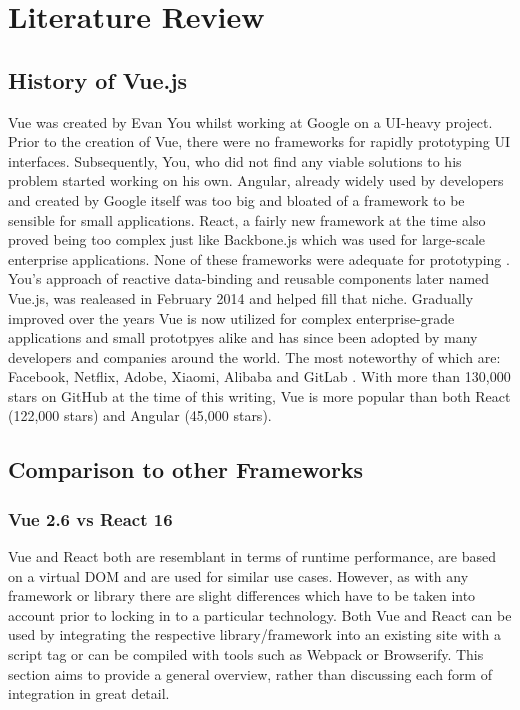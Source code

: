 \chapter[Literature Review]{Literature Review}

\section{History of Vue.js}
Vue was created by Evan You whilst working at Google on a UI-heavy project. Prior to the creation of Vue, there were no frameworks for rapidly prototyping UI interfaces. Subsequently, You, who did not find any viable solutions to his problem started working on his own. Angular, already widely used by developers and created by Google itself was too big and bloated of a framework to be sensible for small applications. React, a fairly new framework at the time also proved being too complex just like Backbone.js which was used for large-scale enterprise applications. None of these frameworks were adequate for prototyping \cite[p.~10]{filipova2016learning}. You's approach of reactive data-binding and reusable components later named Vue.js, was realeased in February 2014 \cite{wiki:Vue} and helped fill that niche. Gradually improved over the years Vue is now utilized for complex enterprise-grade applications and small prototpyes alike and has since been adopted by many developers and companies around the world. The most noteworthy of which are: Facebook, Netflix, Adobe, Xiaomi, Alibaba and GitLab \cite{CompaniesUsingVue:online}. With more than 130,000 stars on GitHub at the time of this writing, Vue is more popular than both React (122,000 stars) and Angular (45,000 stars).


\section{Comparison to other Frameworks}

\subsection{Vue 2.6 vs React 16}
Vue and React both are resemblant in terms of runtime performance, are based on a virtual DOM and are used for similar use cases. However, as with any framework or library there are slight differences which have to be taken into account prior to locking in to a particular technology. Both Vue and React can be used by integrating the respective library/framework into an existing site with a script tag or can be compiled with tools such as Webpack or Browserify. This section aims to provide a general overview, rather than discussing each form of integration in great detail.

